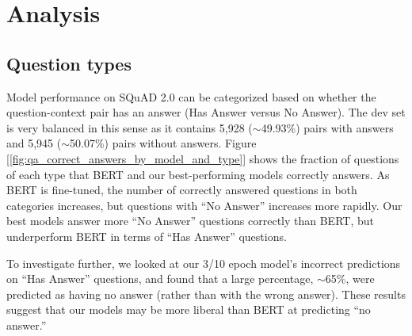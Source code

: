 %
%
\begingroup
\renewcommand{\cleardoublepage}{}
\renewcommand{\clearpage}{}
\chapter*{Analysis}\label{chap:Analysis}
\renewcommand{\chapter}[2]{}%



\label{sec:analysis}
\doubleline
\vspace{-1em}

\section{Question types}

Model performance on SQuAD 2.0 can be categorized based on whether the question-context pair has an answer (Has Answer versus No Answer). The dev set is very balanced in this sense as it contains 5,928 ($\sim$49.93\%) pairs with answers and 5,945 ($\sim$50.07\%) pairs without answers. Figure [\ref{fig:qa_correct_answers_by_model_and_type}] shows the fraction of questions of each type that BERT and our best-performing models correctly answers. As BERT is fine-tuned, the number of correctly answered questions in both categories increases, but questions with “No Answer” increases more rapidly. Our best models answer more “No Answer” questions correctly than BERT, but underperform BERT in terms of “Has Answer” questions.

To investigate further, we looked at our 3/10 epoch model’s incorrect predictions on “Has Answer” questions, and found that a large percentage, $\sim$65\%, were predicted as having no answer (rather than with the wrong answer). These results suggest that our models may be more liberal than BERT at predicting “no answer.”


